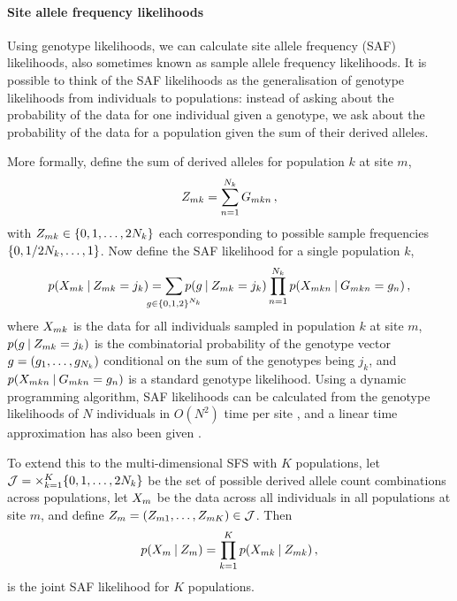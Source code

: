\paragraph{Site allele frequency likelihoods}

Using genotype likelihoods, we can calculate site allele frequency (SAF) likelihoods, also sometimes known as sample allele frequency likelihoods.
It is possible to think of the SAF likelihoods as the generalisation of genotype likelihoods from individuals to populations:
instead of asking about the probability of the data for one individual given a genotype, we ask about the probability of the data for a population given the sum of their derived alleles.

More formally, define the sum of derived alleles for population $k$ at site $m$,
%
\begin{equation}
    \ct[mk] = \sum_{n = 1}^{N_k} \gt[mkn] 
    \, ,
\end{equation}
%
with $\ct[mk] \in \set{0, 1, \dots, 2N_k}$ each corresponding to possible sample frequencies $\{0, 1/2N_k, \dots, 1\}$. Now define the SAF likelihood for a single population $k$,
%
\begin{equation}\label{eq:saf}
    \prob(\data[mk] \given \ct[mk] = j_k)
	= \sum_{\mathclap{g \in \set{0, 1, 2}^{N_k}}}
		\prob(g \given \ct[mk] = j_k) 
		\prod_{n = 1}^{N_k} 
			\prob(\data[mkn] \given \gt[mkn] = g_n)
    \, ,
\end{equation}
%
where $\data[mk]$ is the data for all individuals sampled in population $k$ at site $m$, $\prob(g \given \ct[mk] = j_k)$ is the combinatorial probability of the genotype vector $g = (g_1, \dots, g_{N_k})$ conditional on the sum of the genotypes being $j_k$, and $\prob(\data[mkn] \given \gt[mkn] = g_n)$ is a standard genotype likelihood.
Using a dynamic programming algorithm, SAF likelihoods can be calculated from the genotype likelihoods of $N$ individuals in $O(N^2)$ time per site \cite{Nielsen2012}, and a linear time approximation has also been given \cite{Han2014}.

To extend this to the multi-dimensional SFS with $K$ populations, let $\mathcal{J} = \times_{k = 1}^K \{ 0, 1, \dots, 2N_{k} \}$ be the set of possible derived allele count combinations across populations, let $\data_m$ be the data across all individuals in all populations at site $m$, and define $\ct[m] = \oset{\ct[m1], \dots, \ct[mK] } \in \ctset$. Then
%
\begin{equation}\label{eq:jointsaf}
    \prob(\data[m] \given \ct[m])
	= \prod_{k = 1}^K \prob(\data[mk] \given \ct[mk])
    \, ,
\end{equation}
%
is the joint SAF likelihood for $K$ populations.

